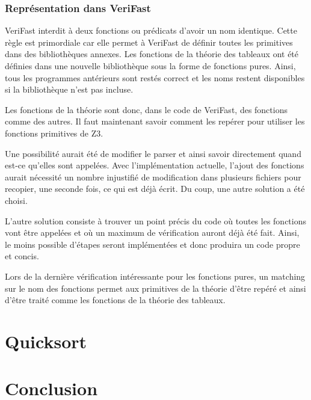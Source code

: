 \documentclass[9pt,openany]{book}
\newcommand{\verifast}{VeriFast}
\begin{document}
		\subsection{Repr\'esentation dans \verifast{}}
		\verifast{} interdit \`a deux fonctions ou pr\'edicats d'avoir un nom identique. Cette r\`egle est primordiale car elle permet \`a \verifast{} de d\'efinir toutes les primitives dans des biblioth\`eques annexes. Les fonctions de la th\'eorie des tableaux ont \'et\'e d\'efinies dans une nouvelle biblioth\`eque sous la forme de fonctions pures. Ainsi, tous les programmes ant\'erieurs sont rest\'es correct et les noms restent disponibles si la biblioth\`eque n'est pas incluse.\par
		Les fonctions de la th\'eorie sont donc, dans le code de \verifast{}, des fonctions comme des autres. Il faut maintenant savoir comment les rep\'erer pour utiliser les fonctions primitives de Z3. \par
		Une possibilit\'e aurait \'et\'e de modifier le parser et ainsi savoir directement quand est-ce qu'elles sont appel\'ees. Avec l'impl\'ementation actuelle, l'ajout des fonctions aurait n\'ecessit\'e un nombre injustifi\'e de modification dans plusieurs fichiers pour recopier, une seconde fois, ce qui est d\'ej\`a \'ecrit. Du coup, une autre solution a \'et\'e choisi. \par
		L'autre solution consiste \`a trouver un point pr\'ecis du code o\`u toutes les fonctions vont \^etre appel\'ees et o\`u un maximum de v\'erification auront d\'ej\`a \'et\'e fait. Ainsi, le moins possible d'\'etapes seront impl\'ement\'ees et donc produira un code propre et concis.\par
		Lors de la derni\`ere v\'erification int\'eressante pour les fonctions pures, un matching sur le nom des fonctions permet aux primitives de la th\'eorie d'\^etre rep\'er\'e et ainsi d'\^etre trait\'e comme les fonctions de la th\'eorie des tableaux.

\chapter{Quicksort}
\chapter{Conclusion}
\tableofcontents
\end{document}
